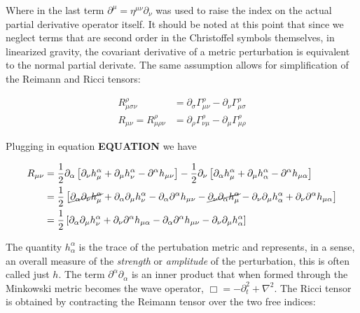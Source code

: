 \documentclass[paper=a4, fontsize=11pt]{scrartcl} %
\numberwithin{equation}{section} %
\numberwithin{figure}{section} %
\numberwithin{table}{section} %
\begin{document}
Where in the last term $\partial^{\mu} = \eta^{\mu \nu}\partial_{\nu}$ was used to raise the index on the actual partial derivative operator itself. It should be noted at this point that since we neglect terms that are second order in the Christoffel symbols themselves, in linearized gravity, the covariant derivative of a metric perturbation is equivalent to the normal partial derivate. The same assumption allows for simplification of the Reimann and Ricci tensors:

\begin{align}
R^{\rho}_{\mu \sigma \nu} &= \partial_{\sigma}\Gamma^{\rho}_{\mu \nu} - \partial_{\nu}\Gamma^{\rho}_{\mu \sigma} \\
R_{\mu \nu} = R^{\rho}_{\mu \rho \nu} &= \partial_{\rho}\Gamma^{\rho}_{\nu \mu} - \partial_{\mu}\Gamma^{\rho}_{\mu \rho}
\end{align}

Plugging in equation \textbf{EQUATION} we have

\begin{align}
R_{\mu \nu} & = \frac{1}{2}\partial_{\alpha}\left[\partial_{\nu}h^{\alpha}_{\mu} + \partial_{\mu}h^{\alpha}_{\nu} - \partial^{\alpha}h_{\mu \nu}\right] - \frac{1}{2}\partial_{\nu}\left[\partial_{\alpha}h^{\alpha}_{\mu} + \partial_{\mu}h^{\alpha}_{\alpha} - \partial^{\alpha}h_{\mu \alpha}\right] \\
&= \frac{1}{2}\left[ \cancel{\partial_{\alpha}\partial_{\nu}h^{\alpha}_{\mu}} + \partial_{\alpha}\partial_{\mu}h^{\alpha}_{\nu} - \partial_{\alpha}\partial^{\alpha}h_{\mu \nu} - \cancel{\partial_{\nu}\partial_{\alpha}h^{\alpha}_{\mu}} - \partial_{\nu}\partial_{\mu}h^{\alpha}_{\alpha} + \partial_{\nu}\partial^{\alpha}h_{\mu \alpha} \right] \\
&= \frac{1}{2}\left[\partial_{\alpha}\partial_{\mu}h^{\alpha}_{\nu} + \partial_{\nu}\partial^{\alpha}h_{\mu \alpha} - \partial_{\alpha}\partial^{\alpha}h_{\mu \nu} - \partial_{\nu}\partial_{\mu}h^{\alpha}_{\alpha}\right]
\end{align}

The quantity $h^{\alpha}_{\alpha}$ is the trace of the pertubation metric and represents, in a sense, an overall measure of the \textit{strength} or \textit{amplitude} of the perturbation, this is often called just $h$. The term $\partial^{\alpha}\partial_{\alpha}$ is an inner product that when formed through the Minkowski metric becomes the wave operator, $\Box = -\partial_{t}^{2} + \nabla^2$. The Ricci tensor is obtained by contracting the Reimann tensor over the two free indices:
\end{document}
